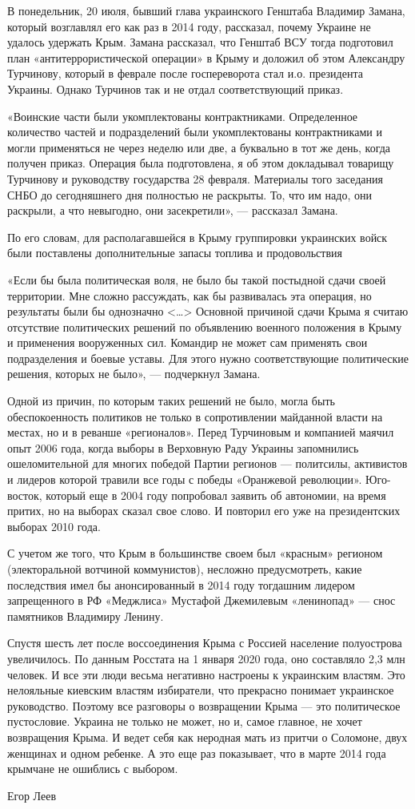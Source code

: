 В понедельник, 20 июля, бывший глава украинского Генштаба Владимир Замана, который возглавлял его как раз в 2014 году, рассказал, почему Украине не удалось удержать Крым. Замана рассказал, что Генштаб ВСУ тогда подготовил план «антитеррористической операции» в Крыму и доложил об этом Александру Турчинову, который в феврале после госпереворота стал и.о. президента Украины. Однако Турчинов так и не отдал соответствующий приказ.

«Воинские части были укомплектованы контрактниками. Определенное количество частей и подразделений были укомплектованы контрактниками и могли применяться не через неделю или две, а буквально в тот же день, когда получен приказ. Операция была подготовлена, я об этом докладывал товарищу Турчинову и руководству государства 28 февраля. Материалы того заседания СНБО до сегодняшнего дня полностью не раскрыты. То, что им надо, они раскрыли, а что невыгодно, они засекретили», — рассказал Замана.

По его словам, для располагавшейся в Крыму группировки украинских войск были поставлены дополнительные запасы топлива и продовольствия

«Если бы была политическая воля, не было бы такой постыдной сдачи своей территории. Мне сложно рассуждать, как бы развивалась эта операция, но результаты были бы однозначно <…> Основной причиной сдачи Крыма я считаю отсутствие политических решений по объявлению военного положения в Крыму и применения вооруженных сил. Командир не может сам применять свои подразделения и боевые уставы. Для этого нужно соответствующие политические решения, которых не было», — подчеркнул Замана.

Одной из причин, по которым таких решений не было, могла быть обеспокоенность политиков не только в сопротивлении майданной власти на местах, но и в реванше «регионалов». Перед Турчиновым и компанией маячил опыт 2006 года, когда выборы в Верховную Раду Украины запомнились ошеломительной для многих победой Партии регионов — политсилы, активистов и лидеров которой травили все годы с победы «Оранжевой революции». Юго-восток, который еще в 2004 году попробовал заявить об автономии, на время притих, но на выборах сказал свое слово. И повторил его уже на президентских выборах 2010 года.

С учетом же того, что Крым в большинстве своем был «красным» регионом (электоральной вотчиной коммунистов), несложно предусмотреть, какие последствия имел бы анонсированный в 2014 году тогдашним лидером запрещенного в РФ «Меджлиса» Мустафой Джемилевым «ленинопад» — снос памятников Владимиру Ленину.

Спустя шесть лет после воссоединения Крыма с Россией население полуострова увеличилось. По данным Росстата на 1 января 2020 года, оно составляло 2,3 млн человек. И все эти люди весьма негативно настроены к украинским властям. Это нелояльные киевским властям избиратели, что прекрасно понимает украинское руководство. Поэтому все разговоры о возвращении Крыма — это политическое пустословие. Украина не только не может, но и, самое главное, не хочет возвращения Крыма. И ведет себя как неродная мать из притчи о Соломоне, двух женщинах и одном ребенке. А это еще раз показывает, что в марте 2014 года крымчане не ошиблись с выбором.

Егор Леев
  
